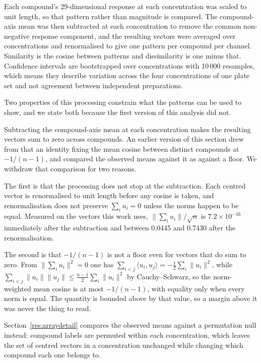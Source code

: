 \documentclass[11pt,a4paper]{article}
\begin{document}
Each compound's 29-dimensional response at each concentration was scaled to unit
length, so that pattern rather than magnitude is compared. The compound-axis mean
was then subtracted at each concentration to remove the common non-negative
response component, and the resulting vectors were averaged over concentrations
and renormalised to give one pattern per compound per channel. Similarity is the
cosine between patterns and dissimilarity is one minus that. Confidence intervals
are bootstrapped over concentrations with 10\,000 resamples, which means they
describe variation across the four concentrations of one plate set and not
agreement between independent preparations.

Two properties of this processing constrain what the patterns can be used to
show, and we state both because the first version of this analysis did not.

Subtracting the compound-axis mean at each concentration makes the resulting
vectors sum to zero across compounds. An earlier version of this section drew
from that an identity fixing the mean cosine between distinct compounds at
$-1/(n-1)$, and compared the observed means against it as against a floor. We
withdraw that comparison for two reasons.

The first is that the processing does not stop at the subtraction. Each centred
vector is renormalised to unit length before any cosine is taken, and
renormalisation does not preserve $\sum_i u_i = 0$ unless the norms happen to
be equal. Measured on the vectors this work uses,
$\lVert\sum_i u_i\rVert/\sqrt{n}$ is $7.2\times10^{-16}$ immediately after
the subtraction and between 0.0445 and 0.7430 after the renormalisation.

The second is that $-1/(n-1)$ is not a floor even for vectors that do sum to
zero. From $\lVert\sum_i u_i\rVert^2 = 0$ one has
$\sum_{i<j}\langle u_i, u_j\rangle = -\tfrac{1}{2}\sum_i \lVert u_i\rVert^2$,
while $\sum_{i<j}\lVert u_i\rVert\lVert u_j\rVert \le
\tfrac{n-1}{2}\sum_i \lVert u_i\rVert^2$ by Cauchy--Schwarz, so the
norm-weighted mean cosine is at most $-1/(n-1)$, with equality only when every
norm is equal. The quantity is bounded above by that value, so a margin above
it was never the thing to read.

Section~\ref{res:arraydetail} compares the observed means against a
permutation null instead: compound labels are permuted within each
concentration, which leaves the set of centred vectors in a concentration
unchanged while changing which compound each one belongs to.
\end{document}
